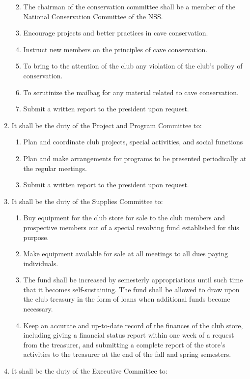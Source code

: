 \documentclass[
]{article}
\providecommand{\tightlist}{%
  \setlength{\itemsep}{0pt}\setlength{\parskip}{0pt}}
\begin{document}
\begin{enumerate}
  \begin{enumerate}
  \def\labelenumii{\Alph{enumii}.}
  \tightlist
  \item
    The chairman of the conservation committee shall be a member of the
    National Conservation Committee of the NSS.
  \item
    Encourage projects and better practices in cave conservation.
  \item
    Instruct new members on the principles of cave conservation.
  \item
    To bring to the attention of the club any violation of the club's
    policy of conservation.
  \item
    To scrutinize the mailbag for any material related to cave
    conservation.
  \item
    Submit a written report to the president upon request.
  \end{enumerate}
\item
  It shall be the duty of the Project and Program Committee to:

  \begin{enumerate}
  \def\labelenumii{\Alph{enumii}.}
  \tightlist
  \item
    Plan and coordinate club projects, special activities, and social
    functions
  \item
    Plan and make arrangements for programs to be presented periodically
    at the regular meetings.
  \item
    Submit a written report to the president upon request.
  \end{enumerate}
\item
  It shall be the duty of the Supplies Committee to:

  \begin{enumerate}
  \def\labelenumii{\Alph{enumii}.}
  \tightlist
  \item
    Buy equipment for the club store for sale to the club members and
    prospective members out of a special revolving fund established for
    this purpose.
  \item
    Make equipment available for sale at all meetings to all dues paying
    individuals.
  \item
    The fund shall be increased by semesterly appropriations until such
    time that it becomes self-sustaining. The fund shall be allowed to
    draw upon the club treasury in the form of loans when additional
    funds become necessary.
  \item
    Keep an accurate and up-to-date record of the finances of the club
    store, including giving a financial status report within one week of
    a request from the treasurer, and submitting a complete report of
    the store's activities to the treasurer at the end of the fall and
    spring semesters.
  \end{enumerate}
\item
  It shall be the duty of the Executive Committee to:


\end{enumerate}
\end{document}
